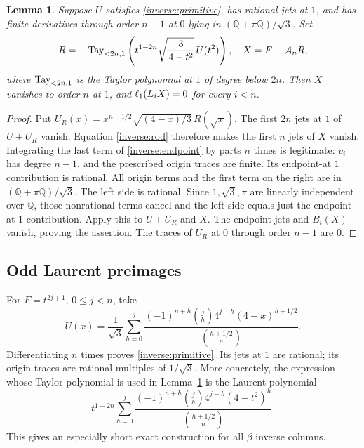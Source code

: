\documentclass[11pt,a4paper]{article}
\numberwithin{equation}{section}
\newtheorem{lemma}[theorem]{Lemma}
\theoremstyle{definition}\newtheorem{definition}[theorem]{Definition}
\theoremstyle{remark}\newtheorem{remark}[theorem]{Remark}
\newcommand{\Q}{\mathbb Q}\newcommand{\Z}{\mathbb Z}\newcommand{\R}{\mathbb R}
\newcommand{\A}{\mathcal A}\newcommand{\Vd}{\mathcal V}\newcommand{\Rp}{\mathbb Z_{(p)}}
\newcommand{\Tr}{\mathop{\rm Tay}\nolimits_{<2n,1}}
\begin{document}
\begin{lemma}\label{inverse:jetlemma}
Suppose $U$ satisfies \eqref{inverse:primitive}, has rational jets at $1$, and has finite derivatives through order $n-1$ at $0$ lying in $(\Q+\pi\Q)/\sqrt3$. Set
\[
 R=-\Tr\left(t^{1-2n}\sqrt{\frac3{4-t^2}}\,U(t^2)\right),\quad
 X=F+\A_nR,
\]
where $\Tr$ is the Taylor polynomial at $1$ of degree below $2n$.
Then $X$ vanishes to order $n$ at $1$, and $\ell_1(L_iX)=0$ for every $i<n$.
\end{lemma}
\begin{proof}
Put $U_R(x)=x^{n-1/2}\sqrt{(4-x)/3}\,R(\sqrt x)$.
The first $2n$ jets at $1$ of $U+U_R$ vanish. Equation \eqref{inverse:rod} therefore makes the first $n$ jets of $X$ vanish. Integrating the last term of \eqref{inverse:endpoint} by parts $n$ times is legitimate: $v_i$ has degree $n-1$, and the prescribed origin traces are finite. Its endpoint-at $1$ contribution is rational. All origin terms and the first term on the right are in $(\Q+\pi\Q)/\sqrt3$. The left side is rational. Since $1,\sqrt3,\pi$ are linearly independent over $\Q$, those nonrational terms cancel and the left side equals just the endpoint-at $1$ contribution. Apply this to $U+U_R$ and $X$. The endpoint jets and $B_i(X)$ vanish, proving the assertion. The traces of $U_R$ at $0$ through order $n-1$ are $0$.
\end{proof}

\subsection{Odd Laurent preimages}
For $F=t^{2j+1}$, $0\le j<n$, take
\begin{equation}\label{inverse:oddprimitive}
 U(x)=\frac1{\sqrt3}\sum_{h=0}^j
 \frac{(-1)^{n+h}\binom jh4^{j-h}(4-x)^{h+1/2}}
      {\binom{h+1/2}{n}}.
\end{equation}
Differentiating $n$ times proves \eqref{inverse:primitive}. Its jets at $1$ are rational; its origin traces are rational multiples of $1/\sqrt3$. More concretely, the expression whose Taylor polynomial is used in Lemma~\ref{inverse:jetlemma} is the Laurent polynomial
\begin{equation}\label{inverse:Laurent}
 t^{1-2n}\sum_{h=0}^j
 \frac{(-1)^{n+h}\binom jh4^{j-h}(4-t^2)^h}
      {\binom{h+1/2}{n}}.
\end{equation}
This gives an especially short exact construction for all $\beta$ inverse columns.
\end{document}
